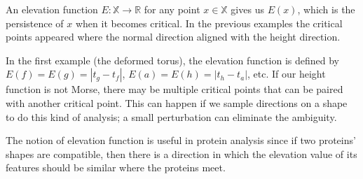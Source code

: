 An elevation function $E:\mathbb{X}\to\mathbb{R}$ for any point $x\in\mathbb{X}$ gives us $E(x)$, which is the persistence of $x$ when it becomes critical. In the previous examples the critical points appeared where the normal direction aligned with the height direction.

In the first example (the deformed torus), the elevation function is defined by $E(f)=E(g)=|t_g-t_f|$, $E(a)=E(h)=|t_h-t_a|$, etc. If our height function is not Morse, there may be multiple critical points that can be paired with another critical point. This can happen if we sample directions on a shape to do this kind of analysis; a small perturbation can eliminate the ambiguity.

The notion of elevation function is useful in protein analysis since if two proteins' shapes are compatible, then there is a direction in which the elevation value of its features should be similar where the proteins meet.


